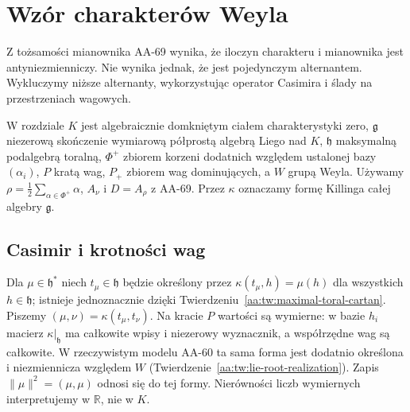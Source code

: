 \chapter[Wzór charakterów Weyla]{Wzór charakterów Weyla}
\label{aa:ch:weyl-character-formula}

Z tożsamości mianownika AA-69 wynika, że iloczyn charakteru i mianownika jest antyniezmienniczy. Nie wynika jednak, że jest pojedynczym alternantem. Wykluczymy niższe alternanty, wykorzystując operator Casimira i ślady na przestrzeniach wagowych.

W rozdziale $K$ jest algebraicznie domkniętym ciałem charakterystyki zero, $\mathfrak g$ niezerową skończenie wymiarową półprostą algebrą Liego nad $K$, $\mathfrak h$ maksymalną podalgebrą toralną, $\Phi^+$ zbiorem korzeni dodatnich względem ustalonej bazy $(\alpha_i)$, $P$ kratą wag, $P_+$ zbiorem wag dominujących, a $W$ grupą Weyla. Używamy $\rho=\frac12\sum_{\alpha\in\Phi^+}\alpha$, $A_\nu$ i $D=A_\rho$ z AA-69. Przez $\kappa$ oznaczamy formę Killinga całej algebry $\mathfrak g$.

\section{Casimir i krotności wag}

Dla $\mu\in\mathfrak h^*$ niech $t_\mu\in\mathfrak h$ będzie określony przez $\kappa(t_\mu,h)=\mu(h)$ dla wszystkich $h\in\mathfrak h$; istnieje jednoznacznie dzięki Twierdzeniu~\ref{aa:tw:maximal-toral-cartan}. Piszemy $(\mu,\nu)=\kappa(t_\mu,t_\nu)$. Na kracie $P$ wartości są wymierne: w bazie $h_i$ macierz $\kappa|_{\mathfrak h}$ ma całkowite wpisy i niezerowy wyznacznik, a współrzędne wag są całkowite. W rzeczywistym modelu AA-60 ta sama forma jest dodatnio określona i niezmiennicza względem $W$ (Twierdzenie~\ref{aa:tw:lie-root-realization}). Zapis $\|\mu\|^2=(\mu,\mu)$ odnosi się do tej formy. Nierówności liczb wymiernych interpretujemy w $\mathbb R$, nie w $K$.


